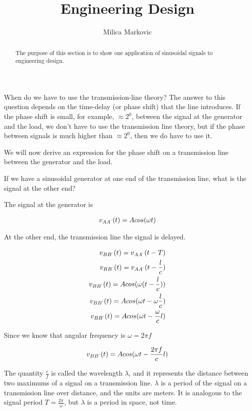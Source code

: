 \documentclass{ximera}
\title{Engineering Design}
\author{Milica Markovic}
\begin{document}
  
\begin{abstract}  
The purpose of this section is to show one application of sinusoidal signals to engineering design.
\end{abstract}  
\maketitle

When do we have to use the transmission-line theory? The answer to this question depends on the time-delay (or phase shift) that the line introduces. If the phase shift is small, for example, $\approx 2^0$, between the signal at the generator and the load, we don't have to use the transmission line theory, but if the phase between signals is much higher than  $\approx 2^0$, then we do have to use it.

We will now derive an expression for the phase shift on a transmission line between the generator and the load.

If we have a sinusoidal generator at one end of the transmission line, what is the signal at the other end?

The signal at the generator is 

\begin{eqnarray}
v_{AA^`}(t)=A cos(\omega t)
\end{eqnarray}

At the other end, the transmission line the signal is delayed.


\begin{eqnarray}
v_{BB^`}(t)=v_{AA^`}(t-T) \\
v_{BB^`}(t)=v_{AA^`}(t-\frac{l}{c}) \\
v_{BB^`}(t)=A cos(\omega (t - \frac{l}{c}))  \\
v_{BB^`}(t)=A cos(\omega t - \omega \frac{l}{c}) \\
v_{BB^`}(t)=A cos(\omega t -  \frac{\omega }{c} l) 
\end{eqnarray}

Since we know that angular frequency is  $\omega = 2 \pi f$


\begin{eqnarray}
v_{BB^`}(t)=A cos(\omega t -  \frac{ 2 \pi f }{c} l)
\end{eqnarray}

The quantity $\frac{c}{f}$ is called the wavelength $\lambda$, and it represents the distance between two maximums of a signal on a transmission line.  $\lambda$ is a period of the signal on a transmission line over distance, and the units are meters. 
It is analogous to the signal period $T=\frac{2 \pi}{\omega}$, but $\lambda$ is a period in space, not time.
\end{document}
